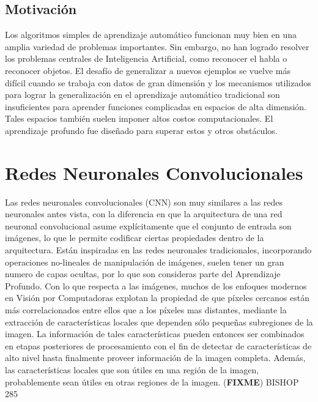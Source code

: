 \documentclass[a4paper,11pt,spanish]{book}
\newcommand*{\FIXME}[1]{{(\textbf{FIXME}) {#1}}}
\begin{document}
    \subsection {Motivación}
      Los algoritmos simples de aprendizaje automático funcionan muy bien en una amplia variedad de problemas importantes.
      Sin embargo, no han logrado resolver los problemas centrales de Inteligencia Artificial, como reconocer el habla o reconocer objetos.
      El desafío de generalizar a nuevos ejemplos se vuelve más difícil cuando se trabaja con datos de gran dimensión y los mecanismos utilizados para lograr la generalización
      en el aprendizaje  automático tradicional son insuficientes para aprender funciones complicadas en espacios de alta dimensión.
      Tales espacios también suelen imponer altos costos computacionales. El aprendizaje profundo fue diseñado para superar estos y otros obstáculos.

  \section {Redes Neuronales Convolucionales}
    Las redes neuronales convolucionales (CNN) son muy similares a las redes neuronales antes vista, con la diferencia en que la arquitectura de una red neuronal convolucional asume explícitamente
    que el conjunto de entrada son imágenes, lo que le permite codificar ciertas propiedades dentro de la arquitectura.
    Están inspiradas en las redes neuronales tradicionales, incorporando operaciones no-lineales de manipulación de imágenes, suelen tener un gran numero de capas ocultas, por lo que
    son consideras parte del Aprendizaje Profundo.
    Con lo que respecta a las imágenes, muchos de los enfoques modernos en Visión por Computadoras explotan la propiedad de que píxeles cercanos están más correlacionados entre ellos que a los píxeles mas
    distantes, mediante la extracción de características locales que dependen sólo pequeñas subregiones de la imagen. La información de tales características pueden entonces ser combinados
    en etapas posteriores de procesamiento con el fin de detectar de características de alto nivel hasta finalmente proveer información de la imagen completa. Además, las características
    locales que son útiles en una región de la imagen, probablemente sean útiles en otras regiones de la imagen. \FIXME{BISHOP 285 }
\end{document}
